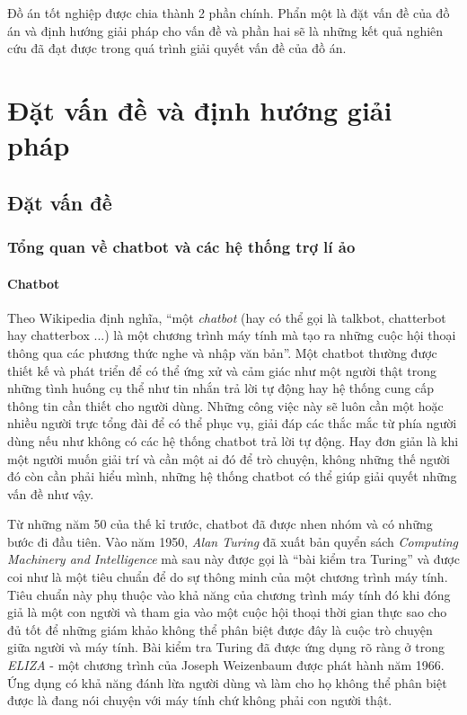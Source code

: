 \documentclass[12pt]{report}
\begin{document}
Đồ án tốt nghiệp được chia thành 2 phần chính. Phẩn một là đặt vấn đề của đồ án và định hướng giải pháp cho vấn đề và phần hai sẽ là những kết quả nghiên cứu đã đạt được trong quá trình giải quyết vấn đề của đồ án.

\newpage
\setcounter{page}{1}

\newcommand{\alice}{A.L.I.C.E}

\part{Đặt vấn đề và định hướng giải pháp}

\startcontents[parts]

\chapter{Đặt vấn đề}
\section{Tổng quan về chatbot và các hệ thống trợ lí ảo}
\subsection{Chatbot}
Theo Wikipedia định nghĩa, ``một \textit{chatbot} (hay có thể gọi là talkbot, chatterbot hay chatterbox ...) là một chương trình máy tính mà tạo ra những cuộc hội thoại thông qua các phương thức nghe và nhập văn bản''. Một chatbot thường được thiết kế và phát triển để có thể ứng xử và cảm giác như một người thật trong những tình huống cụ thể như tin nhắn trả lời tự động hay hệ thống cung cấp thông tin cần thiết cho người dùng. Những công việc này sẽ luôn cần một hoặc nhiều người trực tổng đài để có thể phục vụ, giải đáp các thắc mắc từ phía người dùng nếu như không có các hệ thống chatbot trả lời tự động. Hay đơn giản là khi một người muốn giải trí và cần một ai đó để trò chuyện, không những thế người đó còn cần phải hiểu mình, những hệ thống chatbot có thể giúp giải quyết những vấn đề như vậy.

Từ những năm 50 của thế kỉ trước, chatbot đã được nhen nhóm và có những bước đi đầu tiên. Vào năm 1950, \textit{Alan Turing} đã xuất bản quyển sách \textit{Computing Machinery and Intelligence} mà sau này được gọi là ``bài kiểm tra Turing'' và được coi như là một tiêu chuẩn để do sự thông minh của một chương trình máy tính. Tiêu chuẩn này phụ thuộc vào khả năng của chương trình máy tính đó khi đóng giả là một con người và tham gia vào một cuộc hội thoại thời gian thực sao cho đủ tốt để những giám khảo không thể phân biệt được đây là cuộc trò chuyện giữa người và máy tính. Bài kiểm tra Turing đã được ứng dụng rõ ràng ở trong \textit{ELIZA} - một chương trình của Joseph Weizenbaum được phát hành năm 1966. Ứng dụng có khả năng đánh lừa người dùng và làm cho họ không thể phân biệt được là đang nói chuyện với máy tính chứ không phải con người thật.
\end{document}
